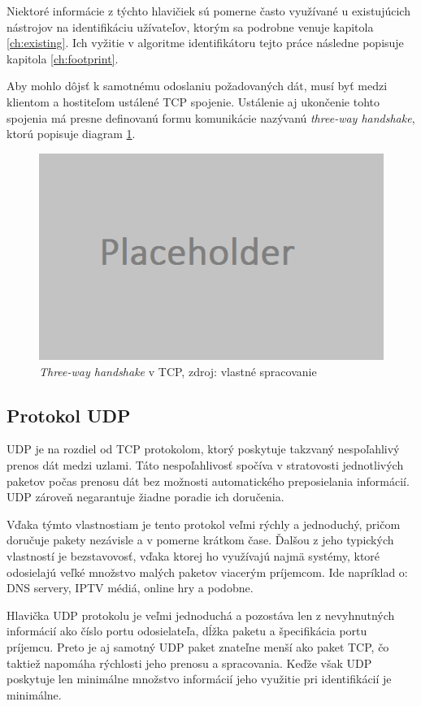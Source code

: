\documentclass[
  digital, %
  table,   %
  lof,     %
  nolot,   %
  nocover
]{fithesis3}
\begin{document}
Niektoré informácie z týchto hlavičiek sú pomerne často využívané u existujúcich
nástrojov na identifikáciu užívateľov, ktorým sa podrobne venuje kapitola
\ref{ch:existing}. Ich vyžitie v algoritme identifikátoru tejto práce následne
popisuje kapitola \ref{ch:footprint}.

Aby mohlo dôjsť k samotnému odoslaniu požadovaných dát, musí byť medzi klientom
a hostiteľom ustálené TCP spojenie. Ustálenie aj ukončenie tohto spojenia má
presne definovanú formu komunikácie nazývanú \textit{three-way handshake}, ktorú
popisuje diagram \ref{fig:net-tcp-flow}.

\begin{figure}[h]
  \centering
    \includegraphics[width=.80\textwidth]{images/net-tcp-flow.png}
  \caption{\textit{Three-way handshake} v TCP, zdroj: vlastné spracovanie}
  \label{fig:net-tcp-flow}
\end{figure}

\subsection{Protokol UDP}
UDP je na rozdiel od TCP protokolom, ktorý poskytuje takzvaný nespoľahlivý
prenos dát medzi uzlami. Táto nespoľahlivosť spočíva v stratovosti jednotlivých
paketov počas prenosu dát bez možnosti automatického preposielania
informácií. UDP zároveň negarantuje žiadne poradie ich doručenia.

Vďaka týmto
vlastnostiam je tento protokol veľmi rýchly a jednoduchý, pričom doručuje
pakety nezávisle a v pomerne krátkom čase. Ďalšou z jeho typických vlastností
je bezstavovosť, vďaka ktorej ho využívajú najmä systémy, ktoré odosielajú
veľké množstvo malých paketov viacerým príjemcom. Ide napríklad o: DNS servery,
IPTV médiá, online hry a podobne.

Hlavička UDP protokolu je veľmi jednoduchá a pozostáva len z nevyhnutných
informácií ako číslo portu odosielateľa, dĺžka paketu a špecifikácia portu
príjemcu. Preto je aj samotný UDP paket znateľne menší ako paket TCP, čo
taktiež napomáha rýchlosti jeho prenosu a spracovania. Keďže však UDP poskytuje
len minimálne množstvo informácií jeho využitie pri identifikácií je minimálne.
\end{document}

